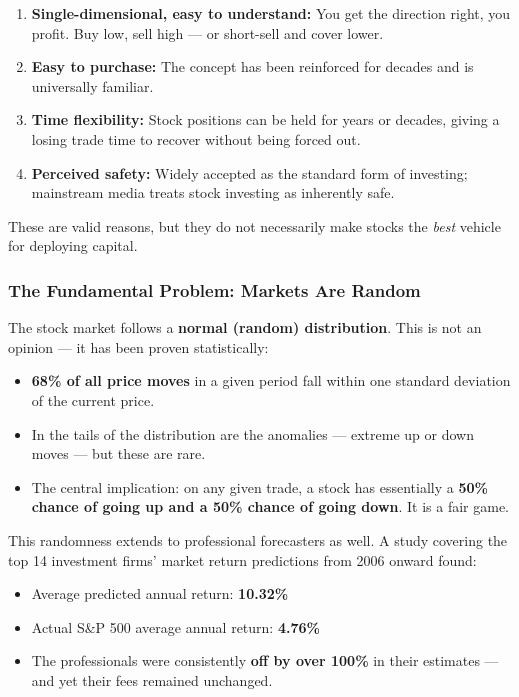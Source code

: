 \documentclass[12pt,openany]{book}
\begin{document}
\begin{enumerate}[leftmargin=*]
    \item \textbf{Single-dimensional, easy to understand:} You get the direction right, you profit. Buy low, sell high — or short-sell and cover lower.
    \item \textbf{Easy to purchase:} The concept has been reinforced for decades and is universally familiar.
    \item \textbf{Time flexibility:} Stock positions can be held for years or decades, giving a losing trade time to recover without being forced out.
    \item \textbf{Perceived safety:} Widely accepted as the standard form of investing; mainstream media treats stock investing as inherently safe.
\end{enumerate}

These are valid reasons, but they do not necessarily make stocks the \emph{best} vehicle for deploying capital.

\subsubsection{The Fundamental Problem: Markets Are Random}

The stock market follows a \textbf{normal (random) distribution}. This is not an opinion — it has been proven statistically:

\begin{itemize}[leftmargin=*]
    \item \textbf{68\% of all price moves} in a given period fall within one standard deviation of the current price.
    \item In the tails of the distribution are the anomalies — extreme up or down moves — but these are rare.
    \item The central implication: on any given trade, a stock has essentially a \textbf{50\% chance of going up and a 50\% chance of going down}. It is a fair game.
\end{itemize}

This randomness extends to professional forecasters as well. A study covering the top 14 investment firms' market return predictions from 2006 onward found:

\begin{itemize}[leftmargin=*]
    \item Average predicted annual return: \textbf{10.32\%}
    \item Actual S\&P 500 average annual return: \textbf{4.76\%}
    \item The professionals were consistently \textbf{off by over 100\%} in their estimates — and yet their fees remained unchanged.
\end{itemize}
\end{document}
